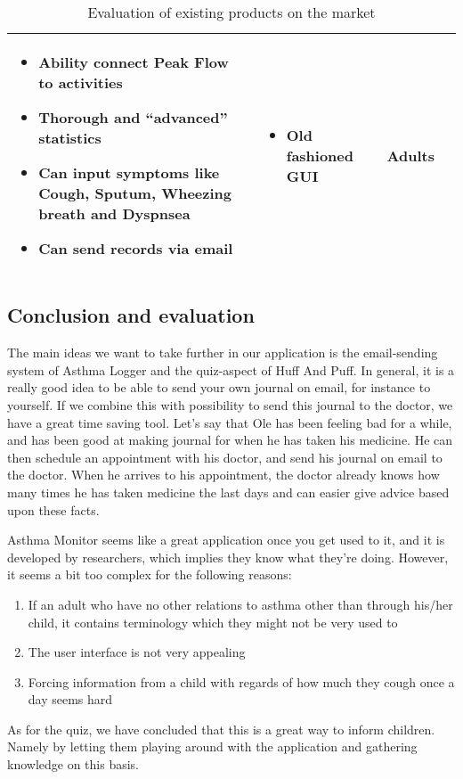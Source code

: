 \begin{sidewaystable}
\begin{tabular}{ | p{4.0cm} | p{5.5cm} | p{5.5cm} | p{4cm}|}
\begin{itemize}
	  \item Ability connect Peak Flow to activities
	  \item Thorough and ``advanced'' statistics
	  \item Can input symptoms like Cough, Sputum, Wheezing breath and Dyspnsea 
	  \item Can send records via email
	\end{itemize}
	&
	\begin{itemize}
	  \item Old fashioned GUI
	\end{itemize}
	& 
	Adults
	\\ \hline
	\end{tabular}
	\caption{Evaluation of existing products on the market}
\end{sidewaystable}

\subsection{Conclusion and evaluation}
\label{existingconcl}

The main ideas we want to take further in our application is the email-sending system of Asthma Logger and the quiz-aspect of Huff And Puff. In general, it is a really good idea to be able to send your own journal on email, for instance to yourself. If we combine this with possibility to send this journal to the doctor, we have a great time saving tool. Let's say that Ole has been feeling bad for a while, and has been good at making journal for when he has taken his medicine. He can then schedule an appointment with his doctor, and send his journal on email to the doctor. When he arrives to his appointment, the doctor already knows how many times he has taken medicine the last days and can easier give advice based upon these facts. 


Asthma Monitor seems like a great application once you get used to it, and it is developed by researchers, which implies they know what they're doing. However, it seems a bit too complex for the following reasons:
\begin{enumerate}
  \item If an adult who have no other relations to asthma other than through his/her child, it contains terminology which they might not be very used to
  \item The user interface is not very appealing
  \item Forcing information from a child with regards of how much they cough once a day seems hard 
\end{enumerate}   

As for the quiz, we have concluded that this is a great way to inform children. Namely by letting them playing around with the application and gathering knowledge on this basis. 



